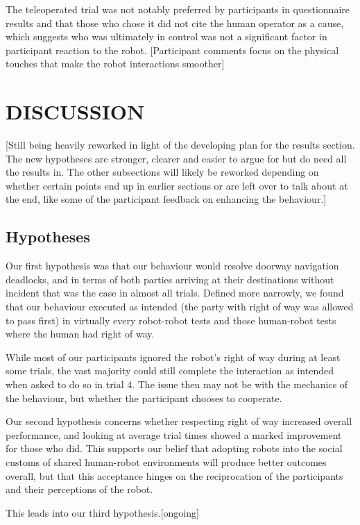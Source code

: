 \documentclass[letterpaper, 10 pt, conference]{ieeeconf}  %
\begin{document}
The teleoperated trial was not notably preferred by participants in questionnaire results and that those who chose it did not cite the human operator as a cause, which suggests who was ultimately in control was not a significant factor in participant reaction to the robot. [Participant comments focus on the physical touches that make the robot interactions smoother]


\section{DISCUSSION}

[Still being heavily reworked in light of the developing plan for the results section. The new hypotheses are stronger, clearer and easier to argue for but do need all the results in. The other subsections will likely be reworked depending on whether certain points end up in earlier sections or are left over to talk about at the end, like some of the participant feedback on enhancing the behaviour.]

\subsection{Hypotheses}

Our first hypothesis was that our behaviour would resolve doorway navigation deadlocks, and in terms of both parties arriving at their destinations without incident that was the case in almost all trials. Defined more narrowly, we found that our behaviour executed as intended (the party with right of way was allowed to pass first) in virtually every robot-robot tests and those human-robot tests where the human had right of way. 

While most of our participants ignored the robot's right of way during at least some trials, the vast majority could still complete the interaction as intended when asked to do so in trial 4. The issue then may not be with the mechanics of the behaviour, but whether the participant chooses to cooperate. 

Our second hypothesis concerns whether respecting right of way increased overall performance, and looking at average trial times showed a marked improvement for those who did. This supports our belief that adopting robots into the social customs of shared human-robot environments will produce better outcomes overall, but that this acceptance hinges on the reciprocation of the participants and their perceptions of the robot.

This leads into our third hypothesis.[ongoing]
\end{document}
